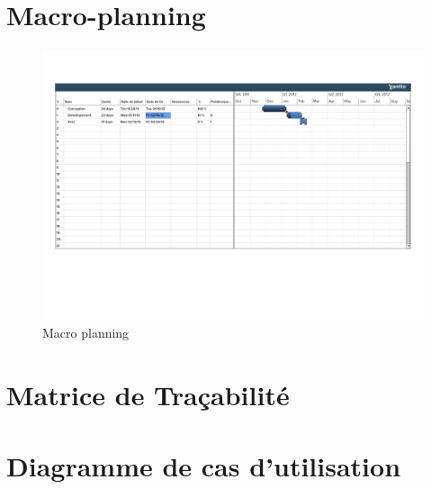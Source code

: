 \documentclass[a4paper,12pt]{article}
\begin{document}
\newpage
\section{Macro-planning}
\paragraph{}
\begin{figure}[!ht]
\begin{center}
  \includegraphics[width=1.1\textwidth,
angle=90]{./Ressources/macroPlanning.pdf}
\end{center}
  \caption{Macro planning}
  \label{uiProject}
\end{figure}

\newpage
\section{Matrice de Traçabilité}



\appendix
\newpage

\section{Diagramme de cas d'utilisation}
\end{document}
